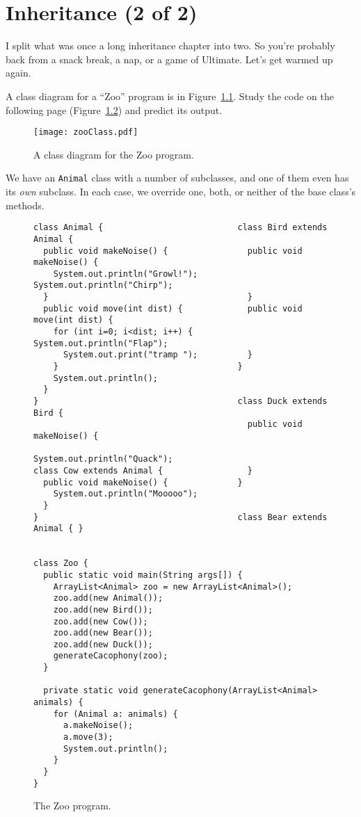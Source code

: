 
\chapter{Inheritance (2 of 2)}
\label{ch:inheritance2}

I split what was once a long inheritance chapter into two. So you're probably
back from a snack break, a nap, or a game of Ultimate. Let's get warmed up
again.

A class diagram for a ``Zoo'' program is in Figure~\ref{fig:zooClass}. Study
the code on the following page (Figure~\ref{fig:zooCode}) and predict its
output.

\begin{figure}[ht]
\label{zooExample}
\centering
\texttt{[image: zooClass.pdf]}
\caption{A class diagram for the Zoo program.}
\label{fig:zooClass}
\end{figure}

We have an \texttt{Animal} class with a number of subclasses, and one of them
even has its \textit{own} subclass. In each case, we override one, both, or
neither of the base class's methods.

\begin{figure}
\begin{Verbatim}[fontsize=\scriptsize,samepage=true,frame=single]
class Animal {                           class Bird extends Animal {
  public void makeNoise() {                public void makeNoise() {
    System.out.println("Growl!");            System.out.println("Chirp");
  }                                        }
  public void move(int dist) {             public void move(int dist) {
    for (int i=0; i<dist; i++) {             System.out.println("Flap");
      System.out.print("tramp ");          }
    }                                    }
    System.out.println();                
  }
}                                        class Duck extends Bird {
                                           public void makeNoise() {
                                             System.out.println("Quack");
class Cow extends Animal {                 }
  public void makeNoise() {              }
    System.out.println("Mooooo");        
  }
}                                        class Bear extends Animal { }


class Zoo {
  public static void main(String args[]) {
    ArrayList<Animal> zoo = new ArrayList<Animal>();
    zoo.add(new Animal());
    zoo.add(new Bird());
    zoo.add(new Cow());
    zoo.add(new Bear());
    zoo.add(new Duck());
    generateCacophony(zoo);
  }

  private static void generateCacophony(ArrayList<Animal> animals) {
    for (Animal a: animals) {
      a.makeNoise();
      a.move(3);
      System.out.println();
    }
  }
}\end{Verbatim}
\caption{The Zoo program.}
\label{fig:zooCode}
\end{figure}

